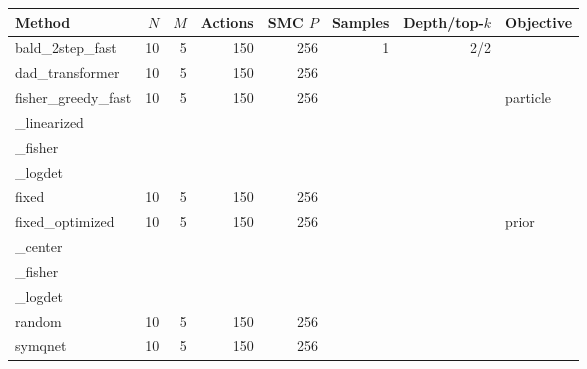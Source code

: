 \begin{tabular}{lrrrrrrl}
\toprule
Method & $N$ & $M$ & Actions & SMC $P$ & Samples & Depth/top-$k$ & Objective \\
\midrule
bald\_2step\_fast & 10 & 5 & 150 & 256 & 1 & 2/2 &  \\
dad\_transformer & 10 & 5 & 150 & 256 &  &  &  \\
fisher\_greedy\_fast & 10 & 5 & 150 & 256 &  &  & particle\\_linearized\\_fisher\\_logdet \\
fixed & 10 & 5 & 150 & 256 &  &  &  \\
fixed\_optimized & 10 & 5 & 150 & 256 &  &  & prior\\_center\\_fisher\\_logdet \\
random & 10 & 5 & 150 & 256 &  &  &  \\
symqnet & 10 & 5 & 150 & 256 &  &  &  \\
\bottomrule
\end{tabular}
